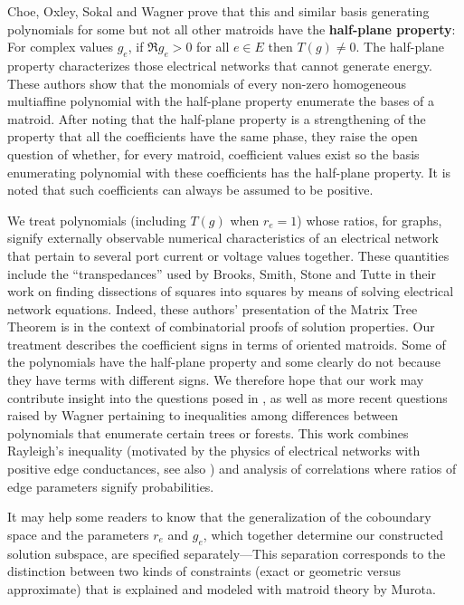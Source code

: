 \documentclass[12pt]{article}
\theoremstyle{definition}
\begin{document}
Choe, Oxley, Sokal and Wagner\cite{ChoeOSW} prove that 
this and similar basis generating polynomials for some but not
all other matroids have the 
\textbf{half-plane property}:
For complex
values $g_e$, if $\Re g_e > 0$ for all $e\in E$ then $T(g)\neq 0$.
The half-plane property 
characterizes those electrical networks that 
cannot generate energy.
These authors show that the monomials of every non-zero homogeneous
multiaffine polynomial with the half-plane property enumerate the bases of
a matroid.  After noting that the half-plane property is a strengthening
of the property that all the coefficients have the same phase, they raise
the open question of whether, for every matroid, coefficient values
exist so the basis enumerating polynomial with these coefficients
has the half-plane property.  It is noted that such coefficients can
always be assumed to be positive.

We treat polynomials 
(including $T(g)$ when $r_e=1$) whose ratios,
for graphs, signify externally observable numerical characteristics of 
an electrical network that pertain to several port current or 
voltage values together.
These quantities include the 
``transpedances'' used by
Brooks, Smith, Stone and Tutte\cite{BSST} in their work on 
finding dissections of squares into squares by means of 
solving electrical network equations.  Indeed, these authors'
presentation of the Matrix Tree Theorem is in the context
of combinatorial proofs of solution properties.  Our treatment
describes the coefficient signs in terms of oriented matroids.
Some of the polynomials have the half-plane property and
some clearly do not because they have terms with different signs.
We therefore hope that our work may contribute insight into
the questions posed in \cite{ChoeOSW}, as well as more recent questions
raised by Wagner\cite{NegCorr}
pertaining to inequalities among differences between 
polynomials that enumerate certain trees or forests.  This work
combines Rayleigh's inequality (motivated by the physics of 
electrical networks with positive edge conductances, see also
\cite{ChoeRayl}) and 
analysis of correlations where ratios of edge parameters
signify probabilities.

It may help some readers to
know that the generalization of the coboundary space
and the parameters $r_e$ and $g_e$, which
together determine our constructed solution subspace, are specified
separately---This separation corresponds to the distinction between two 
kinds of constraints (exact or geometric versus approximate)
that is explained and modeled with matroid
theory by Murota\cite{Murota}.   
\end{document}
